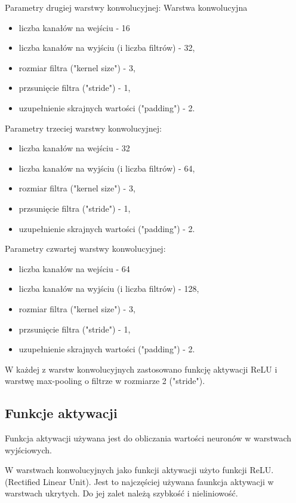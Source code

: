 \documentclass{sprz}
\begin{document}
Parametry drugiej warstwy konwolucyjnej:
Warstwa konwolucyjna
\begin{itemize}
  \item{liczba kanałów na wejściu - 16}
  \item{liczba kanałów na wyjściu (i liczba filtrów) - 32,}
  \item{rozmiar filtra ("kernel size") - 3,}
  \item {przsunięcie filtra ("stride") - 1,}
  \item{uzupełnienie skrajnych wartości ("padding") - 2.}
\end{itemize}


Parametry trzeciej warstwy konwolucyjnej:
\begin{itemize}
  \item{liczba kanałów na wejściu - 32}
  \item{liczba kanałów na wyjściu (i liczba filtrów) - 64,}
  \item{rozmiar filtra ("kernel size") - 3,}
  \item {przsunięcie filtra ("stride") - 1,}
  \item{uzupełnienie skrajnych wartości ("padding") - 2.}
\end{itemize}

Parametry czwartej warstwy konwolucyjnej:
\begin{itemize}
  \item{liczba kanałów na wejściu - 64}
  \item{liczba kanałów na wyjściu (i liczba filtrów) - 128,}
  \item{rozmiar filtra ("kernel size") - 3,}
  \item {przsunięcie filtra ("stride") - 1,}
  \item{uzupełnienie skrajnych wartości ("padding") - 2.}
\end{itemize}


W każdej z warstw konwolucyjnych zastosowano funkcję aktywacji ReLU i warstwę max-pooling o filtrze w rozmiarze 2 ("stride").

\subsection{Funkcje aktywacji}
Funkcja aktywacji używana jest do obliczania wartości neuronów w warstwach wyjściowych.

W warstwach konwolucyjnych jako funkcji aktywacji użyto funkcji ReLU. (Rectified Linear Unit). Jest to najczęściej używana faunkcja aktywacji w warstwach ukrytych. Do jej zalet należą szybkość i nieliniowość.
\end{document}
